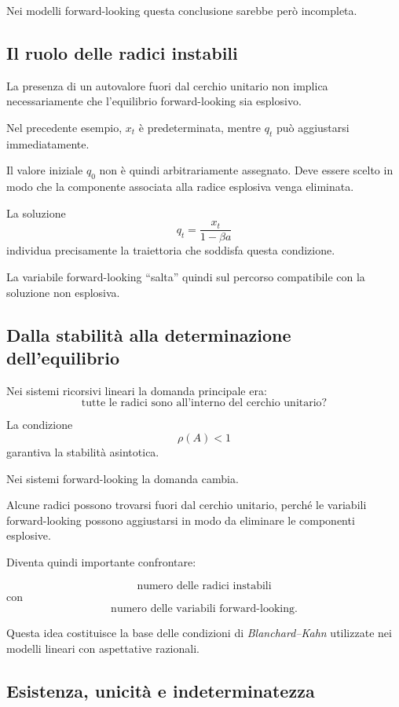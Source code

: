 \documentclass{book}
\begin{document}
Nei modelli forward-looking questa conclusione sarebbe però incompleta.


\subsection{Il ruolo delle radici instabili}

La presenza di un autovalore fuori dal cerchio unitario non implica
necessariamente che l'equilibrio forward-looking sia esplosivo.

Nel precedente esempio, $x_t$ è predeterminata, mentre $q_t$ può
aggiustarsi immediatamente.

Il valore iniziale $q_0$ non è quindi arbitrariamente assegnato.
Deve essere scelto in modo che la componente associata alla radice
esplosiva venga eliminata.

La soluzione
\[
q_t
=
\frac{x_t}{1-\beta a}
\]
individua precisamente la traiettoria che soddisfa questa condizione.

La variabile forward-looking ``salta'' quindi sul percorso compatibile
con la soluzione non esplosiva.


\subsection{Dalla stabilità alla determinazione dell'equilibrio}

Nei sistemi ricorsivi lineari la domanda principale era:
\[
\text{tutte le radici sono all'interno del cerchio unitario?}
\]

La condizione
\[
\rho(A)<1
\]
garantiva la stabilità asintotica.

Nei sistemi forward-looking la domanda cambia.

Alcune radici possono trovarsi fuori dal cerchio unitario, perché le
variabili forward-looking possono aggiustarsi in modo da eliminare le
componenti esplosive.

Diventa quindi importante confrontare:

\[
\text{numero delle radici instabili}
\]
con
\[
\text{numero delle variabili forward-looking}.
\]

Questa idea costituisce la base delle condizioni di
\emph{Blanchard--Kahn} utilizzate nei modelli lineari con aspettative
razionali.


\subsection{Esistenza, unicità e indeterminatezza}
\end{document}
